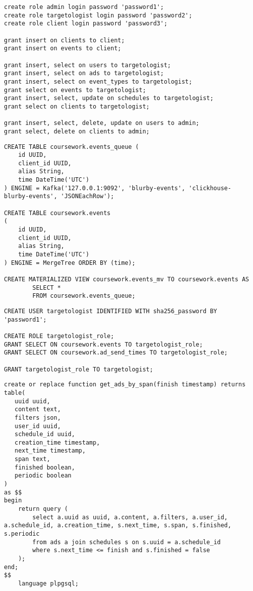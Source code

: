 \begin{appendices}
	\begin{lstlisting}[label=createRolePG,caption=SQL-скрипт создания ролей в системе управления базами данных Postgres]
create role admin login password 'password1';
create role targetologist login password 'password2';
create role client login password 'password3';

grant insert on clients to client;
grant insert on events to client;

grant insert, select on users to targetologist;
grant insert, select on ads to targetologist;
grant insert, select on event_types to targetologist;
grant select on events to targetologist;
grant insert, select, update on schedules to targetologist;
grant select on clients to targetologist;

grant insert, select, delete, update on users to admin;
grant select, delete on clients to admin;
	\end{lstlisting}
	
	\begin{lstlisting}[label=createCH,caption=SQL-скрипт создания таблицы events в СУБД ClickHouse]
CREATE TABLE coursework.events_queue (
    id UUID,
    client_id UUID,
    alias String,
    time DateTime('UTC')
) ENGINE = Kafka('127.0.0.1:9092', 'blurby-events', 'clickhouse-blurby-events', 'JSONEachRow');
		
CREATE TABLE coursework.events
(
    id UUID,
    client_id UUID,
    alias String,
    time DateTime('UTC')
) ENGINE = MergeTree ORDER BY (time);
		
CREATE MATERIALIZED VIEW coursework.events_mv TO coursework.events AS
		SELECT *
		FROM coursework.events_queue;
	\end{lstlisting}
	
	\begin{lstlisting}[label=createRoleCH,caption=SQL-скрипт создания ролей в СУБД ClickHouse]
CREATE USER targetologist IDENTIFIED WITH sha256_password BY 'password1';

CREATE ROLE targetologist_role;
GRANT SELECT ON coursework.events TO targetologist_role;
GRANT SELECT ON coursework.ad_send_times TO targetologist_role;

GRANT targetologist_role TO targetologist;
	\end{lstlisting}
	
	\begin{lstlisting}[label=createFuncPG,caption=SQL-скрипт табличной функции в СУБД Postgres]
create or replace function get_ads_by_span(finish timestamp) returns table(
   uuid uuid,
   content text,
   filters json,
   user_id uuid,
   schedule_id uuid,
   creation_time timestamp,
   next_time timestamp,
   span text,
   finished boolean,
   periodic boolean
)
as $$
begin
    return query (
        select a.uuid as uuid, a.content, a.filters, a.user_id, a.schedule_id, a.creation_time, s.next_time, s.span, s.finished, s.periodic
        from ads a join schedules s on s.uuid = a.schedule_id
        where s.next_time <= finish and s.finished = false
    );
end;
$$
    language plpgsql;
	\end{lstlisting}
	

\end{appendices}
